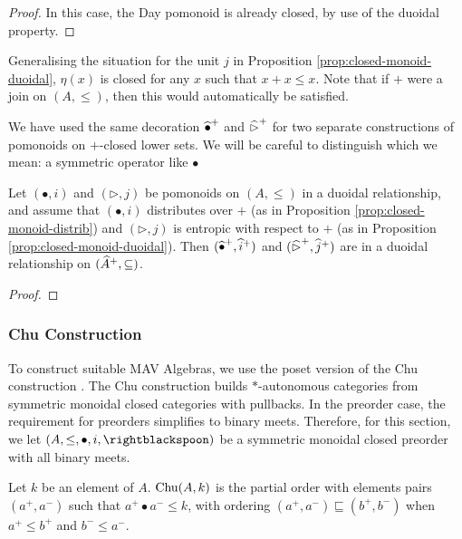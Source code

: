 \begin{proof}
  In this case, the Day pomonoid is already closed, by use of the duoidal property.

\end{proof}

\begin{remark}
  Generalising the situation for the unit $j$ in Proposition
  \ref{prop:closed-monoid-duoidal}, $\eta(x)$ is closed for any $x$
  such that $x + x \leq x$. Note that if $+$ were a join on
  $(A, \leq)$, then this would automatically be satisfied.
\end{remark}

\begin{remark}
  We have used the same decoration $\mathop{\widehat{\bullet}^+}$ and
  $\mathop{\widehat{\rhd}^+}$ for two separate constructions of pomonoids on
  $+$-closed lower sets. We will be careful to distinguish which we
  mean: a symmetric operator like $\bullet$ 
\end{remark}

\begin{proposition}
  Let $(\bullet, i)$ and $(\rhd, j)$ be pomonoids on $(A, \leq)$ in a
  duoidal relationship, and assume that $(\bullet, i)$ distributes
  over $+$ (as in Proposition \ref{prop:closed-monoid-distrib}) and
  $(\rhd, j)$ is entropic with respect to $+$ (as in Proposition
  \ref{prop:closed-monoid-duoidal}). Then
  $(\mathop{\widehat{\bullet}^+}, \mathop{\widehat{i}^+})$ and
  $(\mathop{\widehat{\rhd}^+}, \mathop{\widehat{j}^+})$ are in a duoidal relationship on
  $(\widehat{A}^+, \subseteq)$.
\end{proposition}

\begin{proof}
\end{proof}

\subsubsection{Chu Construction}

To construct suitable MAV Algebras, we use the poset version of the
Chu construction \cite{barr}. The Chu construction builds
$*$-autonomous categories from symmetric monoidal closed categories
with pullbacks. In the preorder case, the requirement for preorders
simplifies to binary meets. Therefore, for this section, we let
$(A, \leq, \bullet, i, \rightblackspoon)$ be a symmetric monoidal
closed preorder with all binary meets.

\begin{definition}
  Let $k$ be an element of $A$. $\mathrm{Chu}(A, k)$ is the partial order with
  elements pairs $(a^+, a^-)$ such that $a^+ \bullet a^- \leq k$, with
  ordering $(a^+,a^-) \sqsubseteq (b^+, b^-)$ when $a^+ \leq b^+$ and
  $b^- \leq a^-$.
\end{definition}


